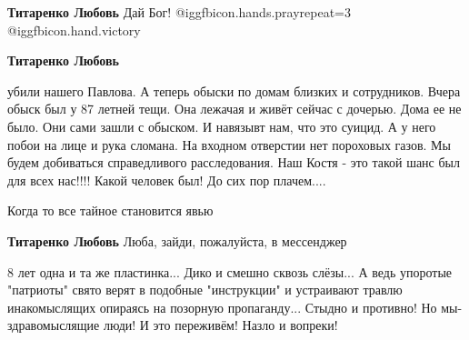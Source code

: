 \begin{itemize}
\begin{itemize}
\textbf{Титаренко Любовь} Дай Бог!  @igg{fbicon.hands.pray}{repeat=3}  @igg{fbicon.hand.victory} ️ 

 
\textbf{Титаренко Любовь} 

убили нашего Павлова. А теперь обыски по домам
близких и сотрудников. Вчера обыск был у 87 летней тещи. Она лежачая и живёт
сейчас с дочерью. Дома ее не было. Они сами зашли с обыском. И навязывт нам,
что это суицид. А у него побои на лице и рука сломана. На входном отверстии нет
пороховых газов. Мы будем добиваться справедливого расследования. Наш Костя -
это такой шанс был для всех нас!!!! Какой человек был! До сих пор плачем....

\end{itemize}

 
Когда то все тайное становится явью

\begin{itemize}
 
\textbf{Титаренко Любовь} Люба, зайди, пожалуйста, в мессенджер
\end{itemize}

 

8 лет одна и та же пластинка... Дико и смешно сквозь слёзы... А ведь упоротые
"патриоты" свято верят в подобные "инструкции" и устраивают травлю
инакомыслящих опираясь на позорную пропаганду... Стыдно и противно! Но
мы-здравомыслящие люди! И это переживём! Назло и вопреки!

\begin{itemize}
 

\end{itemize}
\end{itemize}
